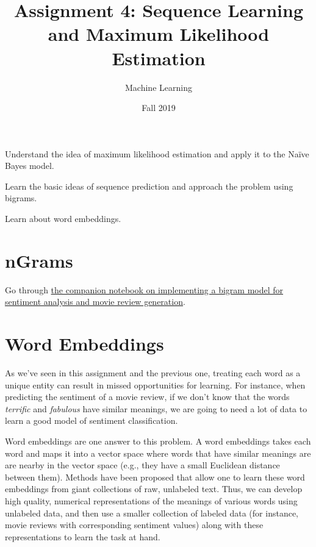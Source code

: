 \documentclass[assignment04_Solutions]{subfiles}
\title{Assignment 4: Sequence Learning and Maximum Likelihood Estimation}
\author{Machine Learning}
\date{Fall 2019}
\begin{document}
\maketitle
\thispagestyle{firstpage}


\begin{learningobjectives}
\bi
\item Understand the idea of maximum likelihood estimation and apply it to the Na\"ive Bayes model.
\item Learn the basic ideas of sequence prediction and approach the problem using bigrams.
\item Learn about word embeddings.
\ei
\end{learningobjectives}

\section{nGrams}

\begin{externalresources}
Go through \href{https://colab.research.google.com/github/mlfa19/assignments/blob/master/Module\%202/04/Assignment_4_Companion_Notebook.ipynb}{the companion notebook on implementing a bigram model for sentiment analysis and movie review generation}.
\end{externalresources}

\section{Word Embeddings}
As we've seen in this assignment and the previous one, treating each word as a unique entity can result in missed opportunities for learning.  For instance, when predicting the sentiment of a movie review, if we don't know that the words \emph{terrific} and \emph{fabulous} have similar meanings, we are going to need a lot of data to learn a good model of sentiment classification.

Word embeddings are one answer to this problem.  A word embeddings takes each word and maps it into a vector space where words that have similar meanings are are nearby in the vector space (e.g., they have a small Euclidean distance between them).  Methods have been proposed that allow one to learn these word embeddings from giant collections of raw, unlabeled text.  Thus, we can develop high quality, numerical representations of the meanings of various words using unlabeled data, and then use a smaller collection of labeled data (for instance, movie reviews with corresponding sentiment values) along with these representations to learn the task at hand.
\end{document}
